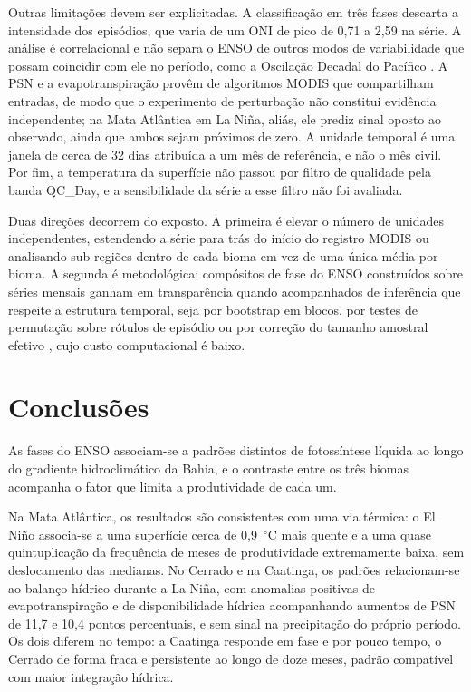 \documentclass[a4paper,fleqn]{cas-sc}
\begin{document}
Outras limitações devem ser explicitadas. A classificação em três fases descarta a intensidade dos episódios, que varia de um ONI de pico de 0,71 a 2,59 na série. A análise é correlacional e não separa o ENSO de outros modos de variabilidade que possam coincidir com ele no período, como a Oscilação Decadal do Pacífico \citep{kayano2007}. A PSN e a evapotranspiração provêm de algoritmos MODIS que compartilham entradas, de modo que o experimento de perturbação não constitui evidência independente; na Mata Atlântica em La Niña, aliás, ele prediz sinal oposto ao observado, ainda que ambos sejam próximos de zero. A unidade temporal é uma janela de cerca de 32 dias atribuída a um mês de referência, e não o mês civil. Por fim, a temperatura da superfície não passou por filtro de qualidade pela banda QC\_Day, e a sensibilidade da série a esse filtro não foi avaliada.

Duas direções decorrem do exposto. A primeira é elevar o número de unidades independentes, estendendo a série para trás do início do registro MODIS ou analisando sub-regiões dentro de cada bioma em vez de uma única média por bioma. A segunda é metodológica: compósitos de fase do ENSO construídos sobre séries mensais ganham em transparência quando acompanhados de inferência que respeite a estrutura temporal, seja por bootstrap em blocos, por testes de permutação sobre rótulos de episódio ou por correção do tamanho amostral efetivo \citep{kunsch1989, politis1994}, cujo custo computacional é baixo.

\section{Conclusões}

As fases do ENSO associam-se a padrões distintos de fotossíntese líquida ao longo do gradiente hidroclimático da Bahia, e o contraste entre os três biomas acompanha o fator que limita a produtividade de cada um.

Na Mata Atlântica, os resultados são consistentes com uma via térmica: o El Niño associa-se a uma superfície cerca de 0,9~$^{\circ}$C mais quente e a uma quase quintuplicação da frequência de meses de produtividade extremamente baixa, sem deslocamento das medianas. No Cerrado e na Caatinga, os padrões relacionam-se ao balanço hídrico durante a La Niña, com anomalias positivas de evapotranspiração e de disponibilidade hídrica acompanhando aumentos de PSN de 11,7 e 10,4 pontos percentuais, e sem sinal na precipitação do próprio período. Os dois diferem no tempo: a Caatinga responde em fase e por pouco tempo, o Cerrado de forma fraca e persistente ao longo de doze meses, padrão compatível com maior integração hídrica.
\end{document}
